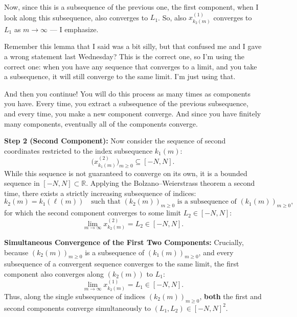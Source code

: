 \begin{proofWrapper}
\begin{speech}[01:01:08 - 01:02:36]
Now, since this is a subsequence of the previous one, the first component, when I look along this subsequence, also converges to $L_1$. So, also $x_{k_2(m)}^{(1)}$ converges to $L_1$ as $m \to \infty$ --- I emphasize. 

Remember this lemma that I said was a bit silly, but that confused me and I gave a wrong statement last Wednesday? This is the correct one, so I'm using the correct one: when you have any sequence that converges to a limit, and you take a subsequence, it will still converge to the same limit. I'm just using that.

And then you continue! You will do this process as many times as components you have. Every time, you extract a subsequence of the previous subsequence, and every time, you make a new component converge. And since you have finitely many components, eventually all of the components converge.
\end{speech}

\begin{hidden}
\end{hidden}

\begin{content}
\textbf{Step 2 (Second Component):}
Now consider the sequence of second coordinates restricted to the index subsequence $k_1(m)$:
\[
\bigl( x_{k_1(m)}^{(2)} \bigr)_{m \ge 0} \subseteq [-N, N].
\]
While this sequence is not guaranteed to converge on its own, it is a bounded sequence in $[-N, N] \subset \mathbb{R}$. Applying the Bolzano--Weierstrass theorem a second time, there exists a strictly increasing subsequence of indices:
\[
k_2(m) = k_1(\ell(m)) \quad \text{such that } (k_2(m))_{m \ge 0} \text{ is a subsequence of } (k_1(m))_{m \ge 0},
\]
for which the second component converges to some limit $L_2 \in [-N, N]$:
\begin{equation}\label{eq:second-component-limit}
\lim_{m \to \infty} x_{k_2(m)}^{(2)} = L_2 \in [-N, N].
\end{equation}

\textbf{Simultaneous Convergence of the First Two Components:}
Crucially, because $(k_2(m))_{m \ge 0}$ is a subsequence of $(k_1(m))_{m \ge 0}$, and every subsequence of a convergent sequence converges to the same limit, the first component also converges along $(k_2(m))$ to $L_1$:
\[
\lim_{m \to \infty} x_{k_2(m)}^{(1)} = L_1 \in [-N, N].
\]
Thus, along the single subsequence of indices $(k_2(m))_{m \ge 0}$, \textbf{both} the first and second components converge simultaneously to $(L_1, L_2) \in [-N, N]^2$.
\end{content}


\end{proofWrapper}
